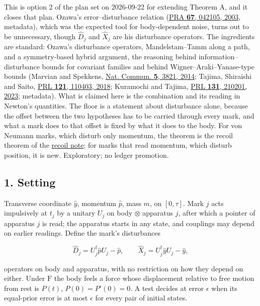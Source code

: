 \documentclass[11pt,a4paper]{article}
\begin{document}
This is option 2 of the plan set on 2026-09-22 for extending Theorem A,
and it closes that plan. Ozawa's error--disturbance relation
(\href{https://doi.org/10.1103/PhysRevA.67.042105}{PRA \textbf{67},
042105, 2003}, metadata), which was the expected tool for body-dependent
noise, turns out to be unnecessary, though \(\hat D_j\) and \(\hat X_j\)
are his disturbance operators. The ingredients are standard: Ozawa's
disturbance operators, Mandelstam--Tamm along a path, and a
symmetry-based hybrid argument, the reasoning behind
information--disturbance bounds for covariant families and behind
Wigner--Araki--Yanase-type bounds (Marvian and Spekkens,
\href{https://doi.org/10.1038/ncomms4821}{Nat. Commun. \textbf{5}, 3821,
2014}; Tajima, Shiraishi and Saito,
\href{https://doi.org/10.1103/PhysRevLett.121.110403}{PRL \textbf{121},
110403, 2018}; Kuramochi and Tajima,
\href{https://doi.org/10.1103/PhysRevLett.131.210201}{PRL \textbf{131},
210201, 2023}; metadata). What is claimed here is the combination and
its reading in Newton's quantities. The floor is a statement about
disturbance alone, because the offset between the two hypotheses has to
be carried through every mark, and what a mark does to that offset is
fixed by what it does to the body. For von Neumann marks, which disturb
only momentum, the theorem is the recoil theorem of the
\href{record-costs-recoil.md}{recoil note}; for marks that read
momentum, which disturb position, it is new. Exploratory; no ledger
promotion.

\hypertarget{setting}{%
\subsection{1. Setting}\label{setting}}

Transverse coordinate \(\hat y\), momentum \(\hat p\), mass \(m\), on
\([0,\tau]\). Mark \(j\) acts impulsively at \(t_j\) by a unitary
\(U_j\) on body \(\otimes\) apparatus \(j\), after which a pointer of
apparatus \(j\) is read; the apparatus starts in any state, and
couplings may depend on earlier readings. Define the mark's disturbances

\[\hat D_j=U_j^\dagger\hat pU_j-\hat p,\qquad \hat X_j=U_j^\dagger\hat yU_j-\hat y,\]

operators on body and apparatus, with no restriction on how they depend
on either. Under \(\mathrm F\) the body feels a force whose displacement
relative to free motion from rest is \(P(t)\), \(P(0)=P'(0)=0\). A test
decides at error \(\epsilon\) when its equal-prior error is at most
\(\epsilon\) for every pair of initial states.
\end{document}
